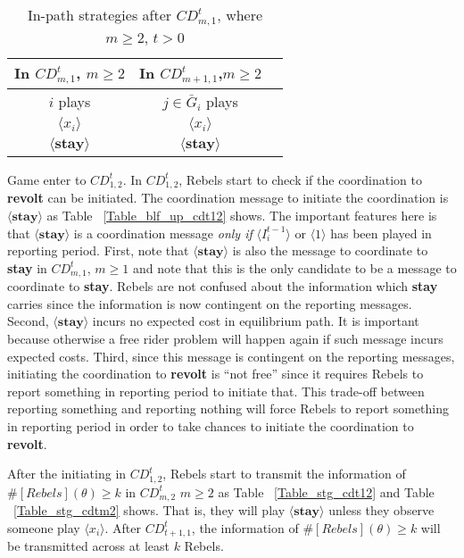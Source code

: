 \documentclass[12pt,letter]{article}
\theoremstyle{definition}
\theoremstyle{remark}
\theoremstyle{claim}
\begin{document}
\begin{table}[ht]
\caption{In-path strategies after $CD^t_{m,1}$, where $m\geq 2$, $t>0$}
\label{Table_stg_cdtm1}
\begin{center}
\begin{tabular}{c c c}
In $CD^t_{m,1}$, $m\geq 2$ 	 	&  	In $CD^t_{m+1,1}$,$m\geq 2$		& 	\\
\hline
\hline
$i$ plays 		  							&  $j\in \bar{G}_{i}$ plays  								& \\
\hline
$\langle x_i \rangle$ 	& 	$\langle x_i \rangle$	    &  \\
$\langle \textbf{stay} \rangle$		&  $\langle \textbf{stay} \rangle$	&  \\

\end{tabular}
\end{center}
\end{table}



Game enter to $CD^t_{1,2}$. In $CD^t_{1,2}$, Rebels start to check if the coordination to \textbf{revolt} can be initiated. The coordination message to initiate the coordination is $\langle \textbf{stay} \rangle$ as Table ~\ref{Table_blf_up_cdt12} shows. The important features here is that $\langle \textbf{stay} \rangle$ is a coordination message \textit{only if} $\langle  {I^{t-1}_i} \rangle$ or $\langle 1 \rangle$ has been played in reporting period.  First, note that $\langle \textbf{stay} \rangle$ is also the message to coordinate to \textbf{stay} in $CD^t_{m,1}$, $m\geq 1$ and note that this is the only candidate to be a message to coordinate to \textbf{stay}. Rebels are not confused about the information which \textbf{stay} carries since the information is now contingent on the reporting messages. Second, $\langle \textbf{stay} \rangle$ incurs no expected cost in equilibrium path. It is important because otherwise a free rider problem will happen again if such message incurs expected costs. Third, since this message is contingent on the reporting messages, initiating the coordination to \textbf{revolt} is ``not free'' since it requires Rebels to report something in reporting period to initiate that. This trade-off between reporting something and reporting nothing will force Rebels to report something in reporting period in order to take chances to initiate the coordination to \textbf{revolt}.

After the initiating in $CD^t_{1,2}$, Rebels start to transmit the information of $\#[Rebels](\theta)\geq k$ in $CD^t_{m,2}$ $m\geq 2$ as Table ~\ref{Table_stg_cdt12} and Table ~\ref{Table_stg_cdtm2} shows. That is, they will play $\langle \textbf{stay} \rangle$ unless they observe someone play $\langle x_i \rangle$. After $CD^t_{{t+1},1}$, the information of $\#[Rebels](\theta)\geq k$ will be transmitted across at least $k$ Rebels. 
\end{document}
